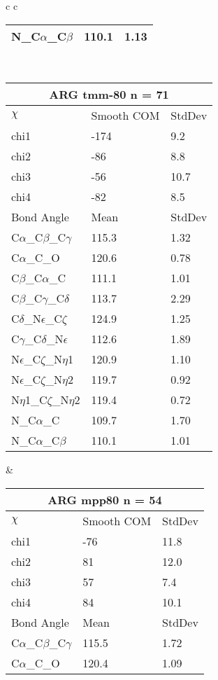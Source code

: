 \begin{longtable}{ c c }
\begin{tabular}{ l l l }
  N\_C$\alpha$\_C$\beta$ & 110.1 & 1.13\\
  \bottomrule
  \end{tabular}
  \\
  \begin{tabular}{ l l l }
  \toprule
  \multicolumn{3}{c}{ARG \textbf{tmm-80} n = 71} \\ \toprule
  $\chi$       & Smooth COM & StdDev \\ \midrule
  chi1 & -174 & 9.2 \\ 
  chi2 & -86 & 8.8 \\ 
  chi3 & -56 & 10.7 \\ 
  chi4 & -82 & 8.5 \\ \midrule
  Bond Angle   & Mean     & StdDev \\ \midrule
  C$\alpha$\_C$\beta$\_C$\gamma$ & 115.3 & 1.32\\
  C$\alpha$\_C\_O & 120.6 & 0.78\\
  C$\beta$\_C$\alpha$\_C & 111.1 & 1.01\\
  C$\beta$\_C$\gamma$\_C$\delta$ & 113.7 & 2.29\\
  C$\delta$\_N$\epsilon$\_C$\zeta$ & 124.9 & 1.25\\
  C$\gamma$\_C$\delta$\_N$\epsilon$ & 112.6 & 1.89\\
  N$\epsilon$\_C$\zeta$\_N$\eta$1 & 120.9 & 1.10\\
  N$\epsilon$\_C$\zeta$\_N$\eta$2 & 119.7 & 0.92\\
  N$\eta$1\_C$\zeta$\_N$\eta$2 & 119.4 & 0.72\\
  N\_C$\alpha$\_C & 109.7 & 1.70\\
  N\_C$\alpha$\_C$\beta$ & 110.1 & 1.01\\
  \bottomrule
  \end{tabular}
  &
  \begin{tabular}{ l l l }
  \toprule
  \multicolumn{3}{c}{ARG \textbf{mpp80} n = 54} \\ \toprule
  $\chi$       & Smooth COM & StdDev \\ \midrule
  chi1 & -76 & 11.8 \\ 
  chi2 & 81 & 12.0 \\ 
  chi3 & 57 & 7.4 \\ 
  chi4 & 84 & 10.1 \\ \midrule
  Bond Angle   & Mean     & StdDev \\ \midrule
  C$\alpha$\_C$\beta$\_C$\gamma$ & 115.5 & 1.72\\
  C$\alpha$\_C\_O & 120.4 & 1.09\\

\end{tabular}
\end{longtable}
